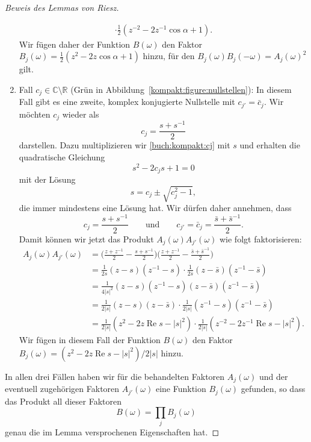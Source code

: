 \begin{proof}[Beweis des Lemmas von Riesz]
\begin{enumerate}
\begin{align*}
\cdot
\frac{1}{2}
(z^{-2}-2z^{-1}\cos\alpha +1).
\end{align*}
Wir fügen daher der Funktion $B(\omega)$ den Faktor
$B_j(\omega)=\frac12(z^2-2z\cos\alpha +1)$ hinzu, für
den 
$B_j(\omega)B_j(-\omega)=A_j(\omega)^2$ gilt.
\item
Fall $c_j\in\mathbb C\setminus\mathbb R$ ({\color{darkgreen}Grün} in
Abbildung~\ref{kompakt:figure:nullstellen}):
In diesem Fall gibt es eine zweite, komplex konjugierte Nullstelle mit
$c_{j'}=\bar{c}_j$.
Wir möchten $c_j$ wieder als
\begin{equation}
c_j
=
\frac{s+s^{-1}}2
\label{buch:kompakt:cj}
\end{equation}
darstellen.
Dazu multiplizieren wir \eqref{buch:kompakt:cj} mit $s$ und erhalten die
quadratische Gleichung
\[
s^2-2c_j s+1=0
\]
mit der Lösung
\[
s=c_j\pm\sqrt{c_j^2-1},
\]
die immer mindestens eine Lösung hat.
Wir dürfen daher annehmen, dass
\[
c_j = \frac{s+s^{-1}}2
\qquad\text{und}\qquad
c_{j'} = \bar{c}_j = \frac{\bar{s}+\bar{s}^{-1}}2.
\]
Damit können wir jetzt das Produkt $A_j(\omega)A_{j'}(\omega)$ 
wie folgt faktorisieren:
\begin{align*}
A_j(\omega)A_{j'}(\omega)
&=
\biggl(
\frac{z+z^{-1}}2 - \frac{s+s^{-1}}2
\biggr)
\biggl(
\frac{z+z^{-1}}2 - \frac{\bar{s}+\bar{s}^{-1}}2
\biggr)
\\
&=
\frac{1}{2s}
(z-s)(z^{-1}-s)
\cdot
\frac{1}{2\bar{s}}
(z-\bar{s})(z^{-1}-\bar{s})
\\
&=
\frac{1}{4|s|^2}(z-s)(z^{-1}-s)(z-\bar{s})(z^{-1}-\bar{s})
\\
&=
\frac1{2|s|}
(z-s)
(z-\bar{s})
\cdot
\frac1{2|s|}
(z^{-1}-s)
(z^{-1}-\bar{s})
\\
&=
\frac1{2|s|}(z^2-2z\operatorname{Re}s -|s|^2)
\cdot
\frac1{2|s|}(z^{-2}-2z^{-1}\operatorname{Re}s -|s|^2).
\end{align*}
Wir fügen in diesem Fall der Funktion $B(\omega)$ den Faktor
$B_j(\omega)=(z^2-2z\operatorname{Re}s-|s|^2)/2|s|$ hinzu.
\end{enumerate}
In allen drei Fällen haben wir für die behandelten Faktoren $A_j(\omega)$
und der eventuell zugehörigen Faktoren $A_{j'}(\omega)$ eine Funktion
$B_j(\omega)$ gefunden, so dass das Produkt all dieser Faktoren
\[
B(\omega)
=
\prod_j B_j(\omega)
\]
genau die im Lemma versprochenen Eigenschaften hat.
\end{proof}

